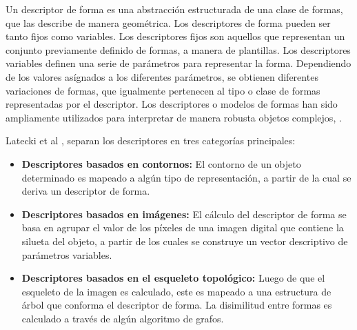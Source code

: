 Un descriptor de forma es una abstracci\'on estructurada 
de una clase de formas, que las describe de manera 
geom\'etrica. Los descriptores de forma pueden ser tanto
fijos como variables. Los descriptores fijos son aquellos
que representan un conjunto previamente definido de formas, 
a manera de plantillas. Los descriptores variables definen
una serie de par\'ametros para representar la forma. Dependiendo
de los valores as\'ignados a los diferentes par\'ametros, se obtienen
diferentes variaciones de formas, que igualmente pertenecen al tipo
o clase de formas representadas por el descriptor. 
Los descriptores o modelos de formas han sido ampliamente utilizados para
interpretar de manera robusta objetos complejos, \cite{wormparam}. 

Latecki et al \cite{shapenonrigid}, separan los descriptores en tres
categor\'ias principales:

\begin{itemize}
\item \textbf{Descriptores basados en contornos: } El contorno de un
objeto determinado es mapeado a alg\'un tipo de representaci\'on, a partir de la cual
se deriva un descriptor de forma.
\item \textbf{Descriptores basados en im\'agenes: } El c\'alculo del descriptor
de forma se basa en agrupar el valor de los p\'ixeles de una imagen digital
que contiene la silueta del objeto, a partir de los cuales se construye un vector
descriptivo de par\'ametros variables.
\item \textbf{Descriptores basados en el esqueleto topol\'ogico: } Luego de que
el esqueleto de la imagen es calculado, este es mapeado a una estructura 
de \'arbol que conforma el descriptor de forma. La disimilitud entre formas
es calculado a trav\'es de alg\'un algoritmo de grafos.
\end{itemize}

